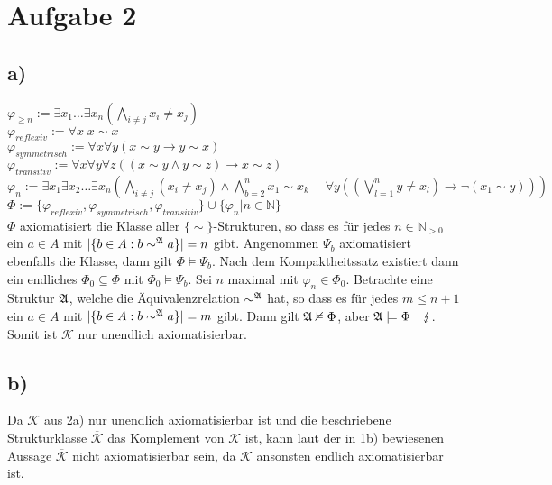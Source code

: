 \documentclass[11pt, a4paper]{article}
\newcommand{\n}{\wedge}
\newcommand{\nmodels}{\nvDash}
\begin{document}
\section*{Aufgabe 2}

\subsection*{a)}
$\varphi_{\geq n} := \exists x_1 \ldots \exists x_n (\bigwedge_{i \neq j} x_i \neq x_j)$\\
$\varphi_{reflexiv} := \forall x \; x \sim x$\\
$\varphi_{symmetrisch} := \forall x \forall y (x \sim y \rightarrow y \sim x)$\\
$\varphi_{transitiv} := \forall x \forall y \forall z ((x \sim y \n y \sim z) \rightarrow x \sim z)$\\

$\varphi_n := \exists x_1 \exists x_2 \ldots \exists x_n (\bigwedge_{i \neq j} (x_i \neq x_j) \n \bigwedge_{b = 2}^{n} x_1 \sim x_k \quad \; \forall y ((\bigvee_{l = 1}^{n} y \neq x_l) \rightarrow \neg (x_1 \sim y)))$\\

$\Phi := \{ \varphi_{reflexiv}, \varphi_{symmetrisch}, \varphi_{transitiv}\} \cup \{ \varphi_n | n \in \mathbb{N}\}$\\
$\Phi$ axiomatisiert die Klasse aller $\{\sim\}$-Strukturen, so dass es für jedes $n \in \mathbb{N}_{>0}$ ein $a \in A$ mit $|\{b \in A : b \sim^{\frak{A}} a\}| = n$ gibt.
Angenommen $\Psi_b$ axiomatisiert ebenfalls die Klasse, dann gilt $\Phi \models \Psi_b$.
Nach dem Kompaktheitssatz existiert dann ein endliches $\Phi_0 \subseteq \Phi$ mit $\Phi_0 \models \Psi_b$.
Sei $n$ maximal mit $\varphi_n \in \Phi_0$.
Betrachte eine Struktur $\frak{A}$, welche die Äquivalenzrelation $\sim^{\frak{A}}$ hat, so dass es für jedes $m \leq n+1$ ein $a \in A$ mit $|\{b \in A : b \sim^{\frak{A}} a \}| = m$ gibt.
Dann gilt $\frak{A} \nmodels \Phi$, aber $\frak{A} \models \Phi \quad \lightning$. Somit ist $\mathcal{K}$ nur unendlich axiomatisierbar.

\subsection*{b)}
Da $\mathcal{K}$ aus 2a) nur unendlich axiomatisierbar ist und die beschriebene Strukturklasse $\overline{\mathcal{K}}$ das Komplement von $\mathcal{K}$ ist, kann laut der in 1b) bewiesenen Aussage $\overline{\mathcal{K}}$ nicht axiomatisierbar sein, da $\mathcal{K}$ ansonsten endlich axiomatisierbar ist.
\end{document}
